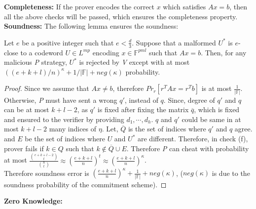 \documentclass[runningheads]{llncs}
\begin{document}
\textbf{Completeness:} If the prover encodes the correct $x$ which satisfies $Ax=b$, then all the above checks will be passed, which ensures the completeness property.\\

\textbf{Soundness:} The following lemma ensures the soundness:

\begin{lemma}
	Let $e$ be a positive integer such that $e < \frac{d}{3}$. Suppose that a malformed $U^*$ is $e$-close to a codeword $U\in L^{mp}$ encoding $x\in \mathbb{F}^{pml}$ such that $Ax=b$. Then, for any malicious \textit{P} strategy, $U^*$ is rejected by \textit{V} except with at most $((e +k +l)/n)^{\kappa} +1/|\mathbb{F}|+neg(\kappa)$ probability.
\end{lemma}

\begin{proof}
	Since we assume that $Ax\neq b$, therefore $Pr_r[r^TAx=r^Tb]$ is at most $\frac{1}{|\mathbb{F}|}$.\\
	 Otherwise, \textit{P} must have sent a wrong $q'$, instead of $q$. Since, degree of $q'$ and $q$ can be at most $k+l-2$, as $q'$ is fixed after fixing the matrix $\overline{q}$, which is fixed and ensured to the verifier by providing $d_1,\cdots, d_h$. $q$ and $q'$ could be same in at most $k+l-2$ many indices of $\eta$. Let, $\overline{Q}$ is the set of indices where $q'$ and $q$ agree. and $E$ be the set of indices where $U$ and $U^*$ are different. Therefore, in check (f), prover fails if $k\in Q$ such that $k\notin \overline{Q}\cup E$. Therefore \textit{P} can cheat with probability at most $\frac{\binom{e+k+l-2}{t}}{\binom{n}{t}}\approx (\frac{e+k+l}{n})^t\approx (\frac{e+k+l}{n})^{\kappa}$.\\
	 Therefore soundness error is $(\frac{e+k+l}{n})^{\kappa}+\frac{1}{|\mathbb{F}|}+neg(\kappa)$, ($neg(\kappa)$ is due to the soundness probability of the commitment scheme).
\end{proof}

\textbf{Zero Knowledge:} %
\end{document}
